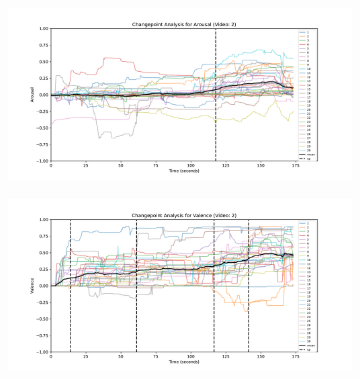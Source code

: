 \documentclass[11pt, letterpaper]{article}
\begin{document}
\begin{figure}
    \centering
    \begin{subfigure}[t]{0.49\textwidth}
        \centering
        \includegraphics[width=\linewidth]{changepoints_V2_arousal_avg_all_data} 
        \caption{} \label{fig:changepoints_V2_arousal_avg_all_data}
    \end{subfigure}
    \hfill
    \begin{subfigure}[t]{0.49\textwidth}
        \centering
        \includegraphics[width=\linewidth]{changepoints_V2_valence_avg_all_data} 
        \caption{} \label{fig:changepoints_V2_valence_avg_all_data}
    \end{subfigure}
    

\end{figure}
\end{document}
